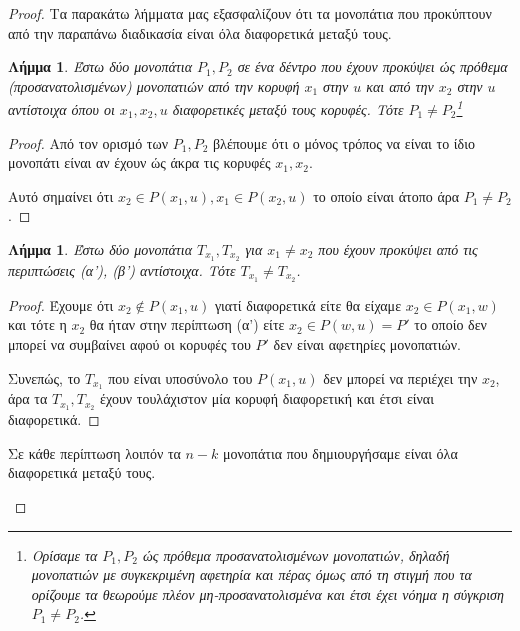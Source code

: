 \documentclass[a4paper, oneside, 11pt]{article}
\newtheorem{lm}[thm]{Λήμμα}
\theoremstyle{definition}
\begin{document}
\begin{enumerate}
\begin{proof}
      Τα παρακάτω λήμματα μας εξασφαλίζουν ότι τα μονοπάτια που προκύπτουν
      από την παραπάνω διαδικασία είναι όλα διαφορετικά μεταξύ τους.

      \begin{lm}
         Έστω δύο μονοπάτια $P_1, P_2$ σε ένα δέντρο που έχουν προκύψει ώς
         πρόθεμα (προσανατολισμένων) μονοπατιών από την κορυφή $x_1$ στην $u$ και
         από την $x_2$ στην $u$ αντίστοιχα όπου οι $x_1, x_2, u$ διαφορετικές
         μεταξύ τους κορυφές. Τότε $P_1 \neq P_2$\footnote{Ορίσαμε τα $P_1, P_2$
         ώς πρόθεμα προσανατολισμένων μονοπατιών, δηλαδή μονοπατιών
         με συγκεκριμένη αφετηρία και πέρας όμως από τη στιγμή που τα ορίζουμε
         τα θεωρούμε πλέον μη-προσανατολισμένα και έτσι έχει νόημα η σύγκριση
         $P_1 \neq P_2$.}
      \end{lm}
      \begin{proof}
         Από τον ορισμό των $P_1, P_2$ βλέπουμε ότι ο μόνος τρόπος να
         είναι το ίδιο μονοπάτι είναι αν έχουν ώς άκρα τις κορυφές
         $x_1, x_2$.

         Αυτό σημαίνει ότι $x_2 \in P(x_1, u), x_1 \in P(x_2, u)$ το οποίο
         είναι άτοπο άρα $P_1 \neq P_2$.
      \end{proof}

      \begin{lm}
      Έστω δύο μονοπάτια $T_{x_1}, T_{x_2}$ για $x_1 \neq x_2$ που έχουν προκύψει
      από τις περιπτώσεις (α'), (β') αντίστοιχα. Τότε $T_{x_1} \neq T_{x_2}$.
      \end{lm}

      \begin{proof}
      Έχουμε ότι
      $x_2 \notin P(x_1, u)$ γιατί διαφορετικά είτε θα είχαμε
      $x_2 \in P(x_1, w)$ και τότε η $x_2$ θα ήταν στην περίπτωση (α') είτε
      $x_2 \in P(w, u) = P'$ το οποίο
      δεν μπορεί να συμβαίνει αφού οι κορυφές του $P'$ δεν είναι αφετηρίες
      μονοπατιών.

      Συνεπώς, το $T_{x_1}$ που είναι υποσύνολο του $P(x_1, u)$ δεν μπορεί
      να περιέχει την $x_2$, άρα τα $T_{x_1}, T_{x_2}$ έχουν τουλάχιστον
      μία κορυφή διαφορετική και έτσι είναι διαφορετικά.
      \end{proof}

      Σε κάθε περίπτωση λοιπόν τα $n-k$ μονοπάτια που δημιουργήσαμε
      είναι όλα διαφορετικά μεταξύ τους.

      \begin{figure}
      \begin{center}
\end{center}
\end{figure}
\end{proof}
\end{enumerate}
\end{document}
